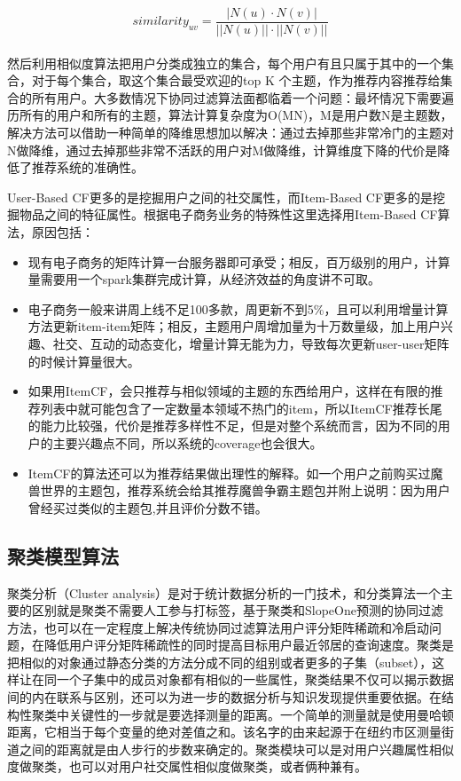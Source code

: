 		\begin{equation}
			similarity_{uv} = \frac{|N(u)\cdot N(v)|}{||N(u)||\cdot||N(v)||}
			\label{cosine-similiarity}
		\end{equation}
		\\然后利用相似度算法把用户分类成独立的集合，每个用户有且只属于其中的一个集合，对于每个集合，取这个集合最受欢迎的top K 个主题，作为推荐内容推荐给集合的所有用户。大多数情况下协同过滤算法面都临着一个问题：最坏情况下需要遍历所有的用户和所有的主题，算法计算复杂度为O(MN)，M是用户数N是主题数，解决方法可以借助一种简单的降维思想加以解决：通过去掉那些非常冷门的主题对N做降维，通过去掉那些非常不活跃的用户对M做降维，计算维度下降的代价是降低了推荐系统的准确性。

		User-Based CF更多的是挖掘用户之间的社交属性，而Item-Based CF更多的是挖掘物品之间的特征属性。根据电子商务业务的特殊性这里选择用Item-Based CF算法，原因包括：
		\begin{itemize}
		\item 现有电子商务的矩阵计算一台服务器即可承受；相反，百万级别的用户，计算量需要用一个spark集群完成计算，从经济效益的角度讲不可取。
		\item 电子商务一般来讲周上线不足100多款，周更新不到5\%，且可以利用增量计算方法更新item-item矩阵；相反，主题用户周增加量为十万数量级，加上用户兴趣、社交、互动的动态变化，增量计算无能为力，导致每次更新user-user矩阵的时候计算量很大。
		\item 如果用ItemCF，会只推荐与相似领域的主题的东西给用户，这样在有限的推荐列表中就可能包含了一定数量本领域不热门的item，所以ItemCF推荐长尾的能力比较强，代价是推荐多样性不足，但是对整个系统而言，因为不同的用户的主要兴趣点不同，所以系统的coverage也会很大。
		\item ItemCF的算法还可以为推荐结果做出理性的解释。如一个用户之前购买过魔兽世界的主题包，推荐系统会给其推荐魔兽争霸主题包并附上说明：因为用户曾经买过类似的主题包,并且评价分数不错。
		\end{itemize}

		\subsection{聚类模型算法}
		聚类分析（Cluster analysis）是对于统计数据分析的一门技术，和分类算法一个主要的区别就是聚类不需要人工参与打标签，基于聚类和SlopeOne预测的协同过滤方法，也可以在一定程度上解决传统协同过滤算法用户评分矩阵稀疏和冷启动问题，在降低用户评分矩阵稀疏性的同时提高目标用户最近邻居的查询速度。聚类是把相似的对象通过静态分类的方法分成不同的组别或者更多的子集（subset），这样让在同一个子集中的成员对象都有相似的一些属性，聚类结果不仅可以揭示数据间的内在联系与区别，还可以为进一步的数据分析与知识发现提供重要依据。在结构性聚类中关键性的一步就是要选择测量的距离。一个简单的测量就是使用曼哈顿距离，它相当于每个变量的绝对差值之和。该名字的由来起源于在纽约市区测量街道之间的距离就是由人步行的步数来确定的。聚类模块可以是对用户兴趣属性相似度做聚类，也可以对用户社交属性相似度做聚类，或者俩种兼有。

